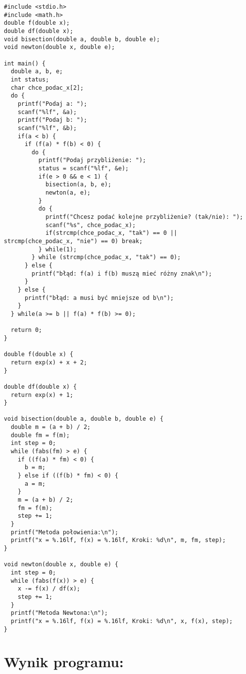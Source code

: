 \documentclass[11pt]{article}
\begin{document}
\begin{lstlisting}
#include <stdio.h>
#include <math.h>
double f(double x);
double df(double x);
void bisection(double a, double b, double e);
void newton(double x, double e);

int main() {
  double a, b, e;
  int status; 
  char chce_podac_x[2];
  do {
    printf("Podaj a: ");
    scanf("%lf", &a);
    printf("Podaj b: ");
    scanf("%lf", &b);
    if(a < b) {
      if (f(a) * f(b) < 0) {
        do {
          printf("Podaj przybliżenie: ");
          status = scanf("%lf", &e);
          if(e > 0 && e < 1) {
            bisection(a, b, e);
            newton(a, e);
          }
          do {
            printf("Chcesz podać kolejne przybliżenie? (tak/nie): ");
            scanf("%s", chce_podac_x);
            if(strcmp(chce_podac_x, "tak") == 0 || strcmp(chce_podac_x, "nie") == 0) break;
          } while(1);
        } while (strcmp(chce_podac_x, "tak") == 0);	
      } else {
        printf("błąd: f(a) i f(b) muszą mieć różny znak\n");
      }	
    } else {
      printf("błąd: a musi być mniejsze od b\n");
    }
  } while(a >= b || f(a) * f(b) >= 0);

  return 0;
}

double f(double x) {
  return exp(x) + x + 2;
}

double df(double x) {
  return exp(x) + 1;
}

void bisection(double a, double b, double e) {
  double m = (a + b) / 2;
  double fm = f(m);
  int step = 0;
  while (fabs(fm) > e) {
    if ((f(a) * fm) < 0) {
      b = m;
    } else if ((f(b) * fm) < 0) {
      a = m;
    }
    m = (a + b) / 2;
    fm = f(m);
    step += 1;
  }
  printf("Metoda połowienia:\n");
  printf("x = %.16lf, f(x) = %.16lf, Kroki: %d\n", m, fm, step);
}

void newton(double x, double e) {
  int step = 0;
  while (fabs(f(x)) > e) {
    x -= f(x) / df(x);
    step += 1;
  }
  printf("Metoda Newtona:\n");
  printf("x = %.16lf, f(x) = %.16lf, Kroki: %d\n", x, f(x), step);
}
\end{lstlisting}

\clearpage
\section{Wynik programu:}
\end{document}
